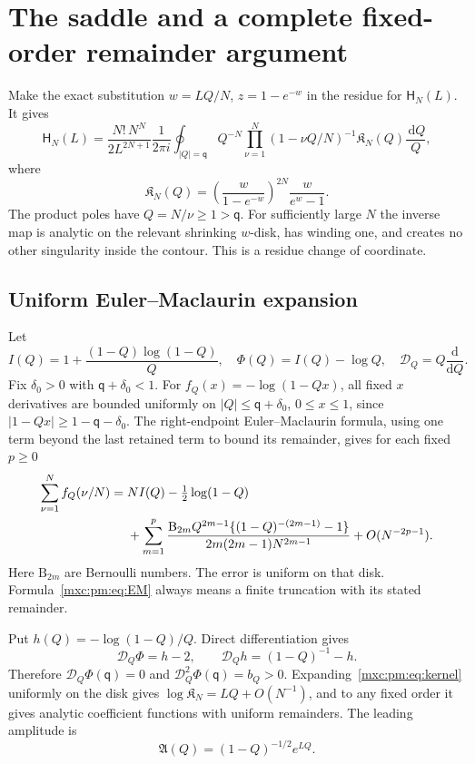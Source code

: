 \documentclass[11pt]{article}
\numberwithin{equation}{section}
\theoremstyle{definition}
\theoremstyle{remark}
\newcommand{\dd}{\,\mathrm d}
\begin{document}
\section{The saddle and a complete fixed-order remainder argument}\label{mxc:pm:sec:saddle}
Make the exact substitution $w=LQ/N$, $z=1-e^{-w}$ in the residue for
$\mathsf H_N(L)$. It gives
\begin{equation}\label{mxc:pm:eq:integral}
 \mathsf H_N(L)=\frac{N!\,N^N}{2L^{2N+1}}
 \frac1{2\pi i}\oint_{|Q|=\mathsf q}Q^{-N}
 \prod_{\nu=1}^N(1-\nu Q/N)^{-1}\mathfrak K_N(Q)\frac{\dd Q}{Q},
\end{equation}
where
\begin{equation}\label{mxc:pm:eq:kernel}
 \mathfrak K_N(Q)=\left(\frac{w}{1-e^{-w}}\right)^{2N}
          \frac{w}{e^w-1}.
\end{equation}
The product poles have $Q=N/\nu\ge1>\mathsf q$. For sufficiently large $N$ the
inverse map is analytic on the relevant shrinking $w$-disk, has winding one,
and creates no other singularity inside the contour. This is a residue change
of coordinate.

\subsection{Uniform Euler--Maclaurin expansion}
Let
\begin{equation}\label{mxc:pm:eq:phase}
 I(Q)=1+\frac{(1-Q)\log(1-Q)}Q,\quad
 \Phi(Q)=I(Q)-\log Q,\quad \mathcal D_Q=Q\frac{\mathrm d}{\mathrm dQ}.
\end{equation}
Fix $\delta_0>0$ with $\mathsf q+\delta_0<1$. For $f_Q(x)=-\log(1-Qx)$, all
fixed $x$ derivatives are bounded uniformly on $|Q|\le\mathsf q+\delta_0$,
$0\le x\le1$, since $|1-Qx|\ge1-\mathsf q-\delta_0$. The right-endpoint
Euler--Maclaurin formula, using one term beyond the last retained term to
bound its remainder, gives for each fixed $p\ge0$
\begin{align}\label{mxc:pm:eq:EM}
 \sum_{\nu=1}^N f_Q(\nu/N)
 ={}&NI(Q)-\tfrac12\log(1-Q)\notag\\
 &+\sum_{m=1}^p
 \frac{\mathrm B_{2m}Q^{2m-1}\{(1-Q)^{-(2m-1)}-1\}}
 {2m(2m-1)N^{2m-1}}+O(N^{-2p-1}).
\end{align}
Here $\mathrm B_{2m}$ are Bernoulli numbers. The error is uniform on that
disk. Formula~\eqref{mxc:pm:eq:EM} always means a finite truncation with its
stated remainder.

Put $h(Q)=-\log(1-Q)/Q$. Direct differentiation gives
\[
 \mathcal D_Q\Phi=h-2,\qquad \mathcal D_Qh=(1-Q)^{-1}-h.
\]
Therefore $\mathcal D_Q\Phi(\mathsf q)=0$ and $\mathcal D_Q^2\Phi(\mathsf q)=b_Q>0$.
Expanding~\eqref{mxc:pm:eq:kernel} uniformly on the disk gives
$\log\mathfrak K_N=LQ+O(N^{-1})$, and to any fixed order it gives analytic
coefficient functions with uniform remainders. The leading amplitude is
\begin{equation}\label{mxc:pm:eq:A}
 \mathfrak A(Q)=(1-Q)^{-1/2}e^{LQ}.
\end{equation}
\end{document}
